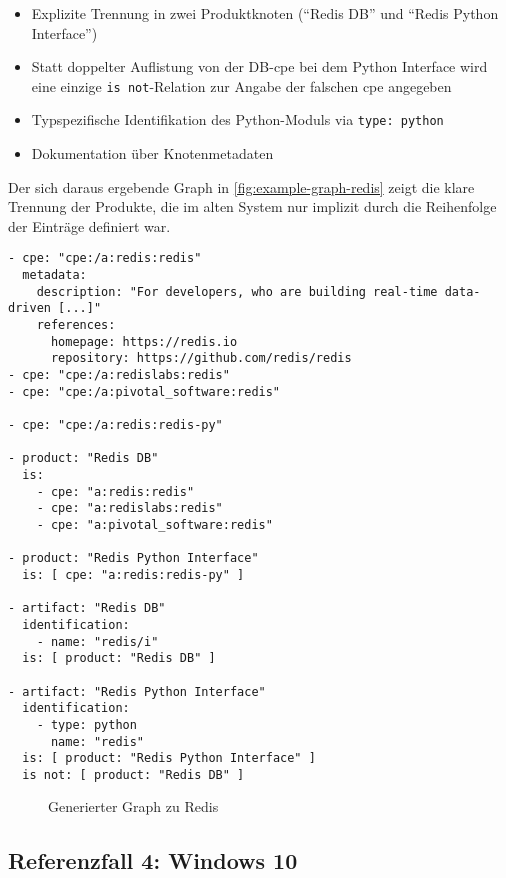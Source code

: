 \begin{itemize}
    \itemsep0em
    \item Explizite Trennung in zwei Produktknoten (\enquote{Redis DB} und \enquote{Redis Python Interface})
    \item Statt doppelter Auflistung von der DB-\acrshort{cpe} bei dem Python Interface wird eine einzige \texttt{is not}-Relation zur Angabe der falschen \acrshort{cpe} angegeben
    \item Typspezifische Identifikation des Python-Moduls via \texttt{type: python}
    \item Dokumentation über Knotenmetadaten
\end{itemize}

Der sich daraus ergebende Graph in \autoref{fig:example-graph-redis} zeigt die klare Trennung der Produkte, die im alten System nur implizit durch die Reihenfolge der Einträge definiert war.

\begin{lstlisting}[style=yaml,caption={Produktmodellierung zu Redis},label={lst:new-correlation-redis},basicstyle=\ttfamily\scriptsize]
- cpe: "cpe:/a:redis:redis"
  metadata:
    description: "For developers, who are building real-time data-driven [...]"
    references:
      homepage: https://redis.io
      repository: https://github.com/redis/redis
- cpe: "cpe:/a:redislabs:redis"
- cpe: "cpe:/a:pivotal_software:redis"

- cpe: "cpe:/a:redis:redis-py"

- product: "Redis DB"
  is:
    - cpe: "a:redis:redis"
    - cpe: "a:redislabs:redis"
    - cpe: "a:pivotal_software:redis"

- product: "Redis Python Interface"
  is: [ cpe: "a:redis:redis-py" ]

- artifact: "Redis DB"
  identification:
    - name: "redis/i"
  is: [ product: "Redis DB" ]

- artifact: "Redis Python Interface"
  identification:
    - type: python
      name: "redis"
  is: [ product: "Redis Python Interface" ]
  is not: [ product: "Redis DB" ]
\end{lstlisting}

\begin{figure}[htbp]
    \centering
    \makebox[\textwidth]{}
    \caption{Generierter Graph zu Redis}
    \label{fig:example-graph-redis}
\end{figure}

\subsection{Referenzfall 4: Windows 10}\label{subsec:example-windows}


